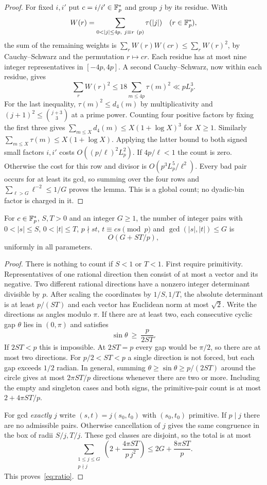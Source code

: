\begin{proof}
For fixed $i,i'$ put $c=i/i'\in\mathbb F_p^*$ and group $j$ by its residue. With
\[
 W(r)=\sum_{0<|j|\le4p,\ j\equiv r\ (p)}\tau(|j|)\quad(r\in\F^*),
\]
the sum of the remaining weights is $\sum_r W(r)W(cr)\le\sum_r W(r)^2$, by Cauchy--Schwarz and the permutation $r\mapsto cr$. Each residue has at most nine integer representatives in $[-4p,4p]$. A second Cauchy--Schwarz, now within each residue, gives
\[
 \sum_r W(r)^2\le 18\sum_{m\le4p}\tau(m)^2\ll pL_p^3.
\]
For the last inequality, $\tau(m)^2\le d_4(m)$ by multiplicativity and $(j+1)^2\le\binom{j+3}{3}$ at a prime power. Counting four positive factors by fixing the first three gives $\sum_{m\le X}d_4(m)\le X(1+\log X)^3$ for $X\ge1$. Similarly $\sum_{m\le X}\tau(m)\le X(1+\log X)$. Applying the latter bound to both signed small factors $i,i'$ costs $O((p/\ell)^2L_p^2)$. If $4p/\ell<1$ the count is zero. Otherwise the cost for this row and divisor is $O(p^3L_p^5/\ell^2)$. Every bad pair occurs for at least its gcd, so summing over the four rows and $\sum_{\ell>G}\ell^{-2}\le1/G$ proves the lemma. This is a global count; no dyadic-bin factor is charged in it.
\end{proof}

\begin{lemma}\label{lem:ratio}
For $c\in\mathbb F_p^*$, $S,T>0$ and an integer $G\ge1$, the number of integer pairs with $0<|s|\le S$, $0<|t|\le T$, $p\nmid st$, $t\equiv cs\pmod p$ and $\gcd(|s|,|t|)\le G$ is
\begin{equation}\label{eq:ratio}
 O(G+ST/p),
\end{equation}
uniformly in all parameters.
\end{lemma}
\begin{proof}
There is nothing to count if $S<1$ or $T<1$. First require primitivity. Representatives of one rational direction then consist of at most a vector and its negative. Two different rational directions have a nonzero integer determinant divisible by $p$. After scaling the coordinates by $1/S,1/T$, the absolute determinant is at least $p/(ST)$ and each vector has Euclidean norm at most $\sqrt2$. Write the directions as angles modulo $\pi$. If there are at least two, each consecutive cyclic gap $\theta$ lies in $(0,\pi)$ and satisfies
\[
  \sin\theta\ \ge\ \frac{p}{2ST}.
\]
If $2ST<p$ this is impossible. At $2ST=p$ every gap would be $\pi/2$, so there are at most two directions. For $p/2<ST<p$ a single direction is not forced, but each gap exceeds $1/2$ radian. In general, summing $\theta\ge\sin\theta\ge p/(2ST)$ around the circle gives at most $2\pi ST/p$ directions whenever there are two or more. Including the empty and singleton cases and both signs, the primitive-pair count is at most $2+4\pi ST/p$.

For gcd \emph{exactly} $j$ write $(s,t)=j(s_0,t_0)$ with $(s_0,t_0)$ primitive. If $p\mid j$ there are no admissible pairs. Otherwise cancellation of $j$ gives the same congruence in the box of radii $S/j,T/j$. These gcd classes are disjoint, so the total is at most
\[
  \sum_{\substack{1\le j\le G\\p\nmid j}}
       \left(2+\frac{4\pi ST}{p\,j^2}\right)
  \le 2G+\frac{8\pi ST}{p}.
\]
This proves~\eqref{eq:ratio}.
\end{proof}

